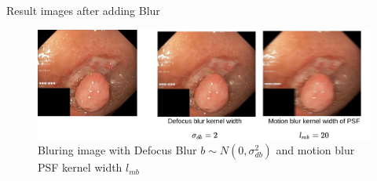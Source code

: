 \documentclass{libs/ufc_format}
\begin{document}
\begin{frame}{Result images after adding Blur}






    \begin{figure}
        \centering
        \includegraphics[width=1\textwidth]{libs/bluraddres2.png}
        \caption{Bluring image with Defocus Blur $b \sim N(0, \sigma^2_{db})$ and motion blur PSF kernel width $l_{mb}$}
        \label{blur_inpainted}
    \end{figure}
\end{frame}
\end{document}
